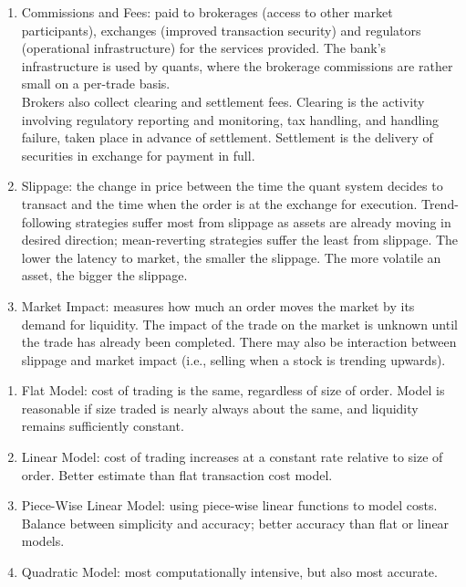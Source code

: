 \documentclass[a4paper,oneside,openany]{book}
\begin{document}
\begin{remark} 
\begin{enumerate}[label=\roman*.]
\setlength{\itemsep}{0pt}
\item Commissions and Fees: paid to brokerages (access to other market participants), exchanges (improved transaction security) and regulators (operational infrastructure) for the services provided. The bank's infrastructure is used by quants, where the brokerage commissions are rather small on a per-trade basis.\\
Brokers also collect clearing and settlement fees. Clearing is the activity involving regulatory reporting and monitoring, tax handling, and handling failure, taken place in advance of settlement. Settlement is the delivery of securities in exchange for payment in full.
\item Slippage: the change in price between the time the quant system decides to transact and the time when the order is at the exchange for execution. Trend-following strategies suffer most from slippage as assets are already moving in desired direction; mean-reverting strategies suffer the least from slippage. The lower the latency to market, the smaller the slippage. The more volatile an asset, the bigger the slippage.
\item Market Impact: measures how much an order moves the market by its demand for liquidity. The impact of the trade on the market is unknown until the trade has already been completed. There may also be interaction between slippage and market impact (i.e., selling when a stock is trending upwards).
\end{enumerate}
\end{remark}

\begin{definition} 
\begin{enumerate}[label=\roman*.]
\setlength{\itemsep}{0pt}
\item Flat Model: cost of trading is the same, regardless of size of order. Model is reasonable if size traded is nearly always about the same, and liquidity remains sufficiently constant.
\item Linear Model: cost of trading increases at a constant rate relative to size of order. Better estimate than flat transaction cost model.
\item Piece-Wise Linear Model: using piece-wise linear functions to model costs. Balance between simplicity and accuracy; better accuracy than flat or linear models.
\item Quadratic Model: most computationally intensive, but also most accurate.
\end{enumerate}
\end{definition}
\end{document}
